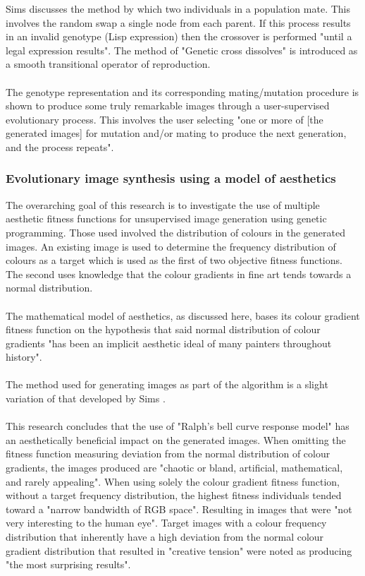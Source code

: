 \documentclass[10pt,a4paper]{article}
\begin{document}
	Sims discusses the method by which two individuals in a population mate.
	This involves the random swap a single node from each parent.
	If this process results in an invalid genotype (Lisp expression) then the crossover is performed "until a legal expression results".
	The method of "Genetic cross dissolves" is introduced as a smooth transitional operator of reproduction.
	\\\\
	The genotype representation and its corresponding mating/mutation procedure is shown to produce some truly remarkable images through a user-supervised evolutionary process.
	This involves the user selecting "one or more of [the generated images] for mutation and/or mating to produce the next generation, and the process repeats".
	
	\subsubsection{Evolutionary image synthesis using a model of aesthetics \citep{aesthetic-measures}}
	
	The overarching goal of this research is to investigate the use of multiple aesthetic fitness functions for unsupervised image generation using genetic programming.
	Those used involved the distribution of colours in the generated images.
	An existing image is used to determine the frequency distribution of colours as a target which is used as the first of two objective fitness functions.
	The second uses knowledge that the colour gradients in fine art tends towards a normal distribution.
	\\\\
	The mathematical model of aesthetics, as discussed here, bases its colour gradient fitness function on the hypothesis that said normal distribution of colour gradients "has been an implicit aesthetic ideal of many painters throughout history".
	\\\\
	The method used for generating images as part of the algorithm is a slight variation of that developed by Sims \citep{sims}.
	\\\\
	This research concludes that the use of "Ralph's bell curve response model" has an aesthetically beneficial impact on the generated images.
	When omitting the fitness function measuring deviation from the normal distribution of colour gradients, the images produced are "chaotic or bland, artificial, mathematical, and rarely appealing".
	When using solely the colour gradient fitness function, without a target frequency distribution, the highest fitness individuals tended toward a "narrow bandwidth of RGB space".
	Resulting in images that were "not very interesting to the human eye".
	Target images with a colour frequency distribution that inherently have a high deviation from the normal colour gradient distribution that resulted in "creative tension" were noted as producing "the most surprising results".
	
\end{document}
